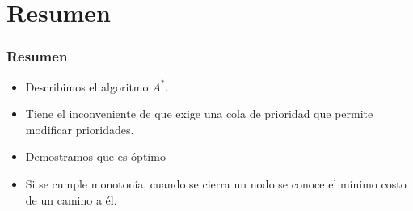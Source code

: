 \documentclass[english, spanish, fleqn,%
hyperref = {colorlinks, urlcolor = blue}%
]{beamer}
\begin{document}
\section{Resumen}

\begin{frame}
  \setcounter{beamerpauses}{2}
  \frametitle{Resumen}

  \begin{itemize}
  \item
    Describimos el algoritmo \(A^*\).
  \item
    Tiene el inconveniente de que exige una cola de prioridad
    que permite modificar prioridades.
  \item
    Demostramos que es óptimo
  \item
    Si se cumple monotonía,
    cuando se cierra un nodo se conoce el mínimo costo de un camino a él.
  \end{itemize}
\end{frame}
\end{document}
